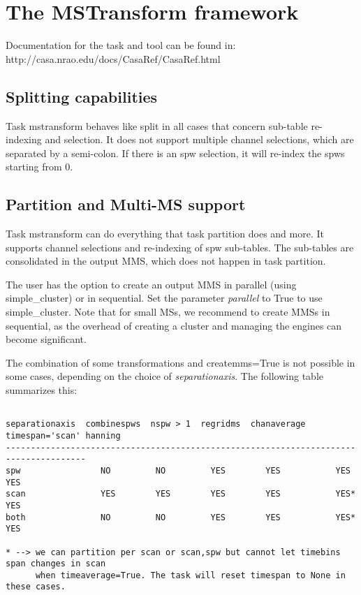 

\section{The MSTransform framework}\label{Sec:Running}
Documentation for the task and tool can be found in:
 {http://casa.nrao.edu/docs/CasaRef/CasaRef.html}

\subsection{Splitting capabilities}
Task mstransform behaves like split in all cases that concern sub-table re-indexing
and selection. It does not support multiple channel selections, which are separated by
a semi-colon. If there is an spw selection, it will re-index the spws starting from 0.

\subsection{Partition and Multi-MS support}
Task mstransform can do everything that task partition does and more. It supports
channel selections and re-indexing of spw sub-tables. The sub-tables are consolidated
in the output MMS, which does not happen in task partition. %

The user has the option to create an output MMS in parallel (using simple_cluster) or
in sequential. Set the parameter {\it parallel} to True to use simple_cluster. Note that
for small MSs, we recommend to create MMSs in sequential, as the overhead of creating
a cluster and managing the engines can become significant.

The combination of some transformations and createmms=True is not possible in
some cases, depending on the choice of {\it separationaxis}. The following table summarizes this:

\begin{verbatim}

separationaxis  combinespws  nspw > 1  regridms  chanaverage  timespan='scan' hanning
--------------------------------------------------------------------------------------
spw                NO         NO         YES        YES           YES           YES
scan               YES        YES        YES        YES           YES*          YES
both               NO         NO         YES        YES           YES*          YES

* --> we can partition per scan or scan,spw but cannot let timebins span changes in scan
      when timeaverage=True. The task will reset timespan to None in these cases.

\end{verbatim}

